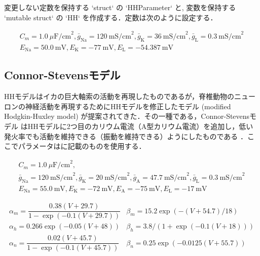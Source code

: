 \documentclass[titlepage]{ltjsbook}
\begin{document}
変更しない定数を保持する `struct` の `HHParameter` と, 変数を保持する `mutable struct` の `HH` を作成する．定数は次のように設定する． 

\begin{equation}
\begin{array}{l}
C_m=1.0\ \mu\textrm{F/cm}^2, \bar{g}_{\text{Na}}=120\ \textrm{mS/cm}^2, \bar{g}_{\text{K}}=36\ \textrm{mS/cm}^2, \bar{g}_{\text{L}}=0.3\ \textrm{mS/cm}^2\\
E_{\text{Na}}=50.0\ \textrm{mV}, E_{\text{K}}=-77\ \textrm{mV}, E_{\text{L}}=-54.387\ \textrm{mV} 
\end{array}
\end{equation}

\subsection{Connor-Stevensモデル}
HHモデルはイカの巨大軸索の活動を再現したものであるが，脊椎動物のニューロンの神経活動を再現するためにHHモデルを修正したモデル (modified Hodgkin-Huxley model) が提案されてきた．その一種である，Connor-Stevensモデル はHHモデルに2つ目のカリウム電流（A型カリウム電流）を追加し，低い発火率でも活動を維持できる（振動を維持できる）ようにしたものである \citep{Connor1971-rs,Connor1977-qo}．ここでパラメータは\citep{Dayan2005-ib}に記載のものを使用する．

\begin{equation}
\begin{array}{l}
C_m=1.0\ \mu\textrm{F/cm}^2,\\ 
\bar{g}_{\text{Na}}=120\ \textrm{mS/cm}^2, \bar{g}_{\text{K}}=20\ \textrm{mS/cm}^2, \bar{g}_{\text{A}}=47.7\ \textrm{mS/cm}^2, \bar{g}_{\text{L}}=0.3\ \textrm{mS/cm}^2\\
E_{\text{Na}}=55.0\ \textrm{mV}, E_{\text{K}}=-72\ \textrm{mV}, E_{\text{A}}=-75\ \textrm{mV},E_{\text{L}}=-17\ \textrm{mV} 
\end{array}
\end{equation}

\begin{equation}
\begin{array}{ll}
\alpha_m=\dfrac{0.38(V+29.7)}{1-\exp (-0.1(V+29.7))} & \beta_m=15.2 \exp (-(V+54.7)/18) \\
\alpha_h=0.266 \exp (-0.05(V+48)) & \beta_h=3.8 /(1+\exp (-0.1(V+18))) \\ 
\alpha_n=\dfrac{0.02(V+45.7)}{1-\exp (-0.1(V+45.7))} & \beta_n=0.25 \exp (-0.0125(V+55.7))
\end{array}
\end{equation}
\end{document}
